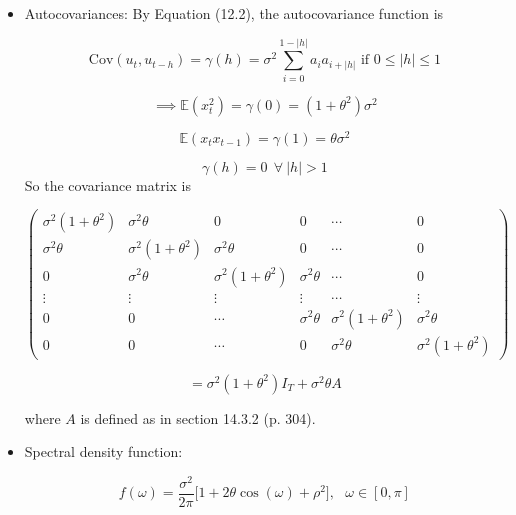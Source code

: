 \documentclass{article}
\newcommand{\E}{\mathbb{E}}
\newcommand{\Var}{\mathrm{Var}}
\newcommand{\Cov}{\mathrm{Cov}}
\begin{document}
\begin{itemize}

\item Autocovariances: By Equation (12.2), the autocovariance function is

\[
\Cov(u_t, u_{t-h})  = \gamma(h) = \sigma^2 \sum_{i=0}^{1 - |h|} a_i a_{i + |h|} \text{ if } 0 \leq |h| \leq 1
\]

\[
\implies \E(x_t^2) = \gamma(0) = (1 + \theta^2)\sigma^2
\]

\[
 \E(x_t x_{t-1}) =  \gamma(1) = \theta \sigma^2
\]

\[
\gamma(h) = 0 \ \ \forall \ |h| > 1
\]
So the covariance matrix is

\[
\begin{pmatrix} 
\sigma^2(1+\theta^2) & \sigma^2\theta & 0 & 0 & \cdots & 0 \\
\sigma^2\theta & \sigma^2(1+\theta^2) & \sigma^2\theta & 0 & \cdots & 0 \\
0 & \sigma^2\theta & \sigma^2(1+\theta^2) & \sigma^2\theta & \cdots & 0 \\
\vdots & \vdots & \vdots & \vdots & \cdots & \vdots \\
 0 & 0& \cdots & \sigma^2\theta  & \sigma^2(1+\theta^2)   & \sigma^2\theta  \\
0 & 0 &  \cdots & 0  & \sigma^2\theta  & \sigma^2(1+\theta^2) 
\end{pmatrix} 
\]

\[
= \sigma^2(1 + \theta^2)I_T + \sigma^2 \theta A
\]

where \(A\) is defined as in section 14.3.2 (p. 304).

\item Spectral density function:

\[
f(\omega) = \frac{\sigma^2}{2\pi} \big[ 1+ 2  \theta \cos( \omega)  + \rho^2  \big] , \ \ \ \omega \in [0, \pi]
 \]

\end{itemize}



%
%
%

\end{document}
